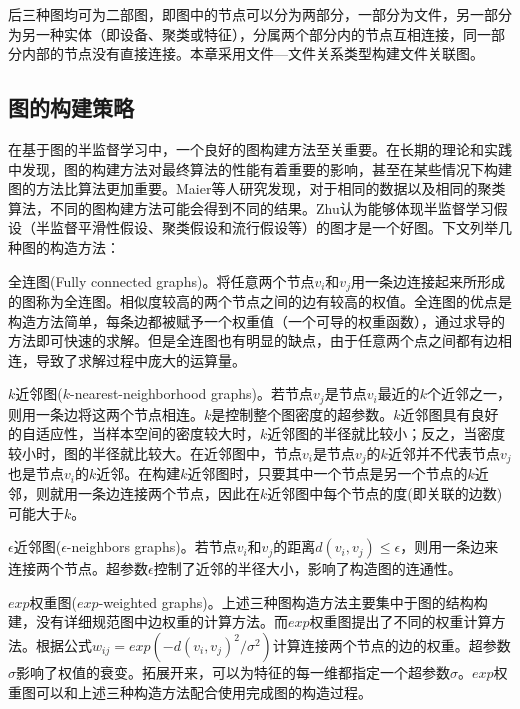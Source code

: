 后三种图均可为二部图，即图中的节点可以分为两部分，一部分为文件，另一部分为另一种实体（即设备、聚类或特征），分属两个部分内的节点互相连接，同一部分内部的节点没有直接连接。本章采用文件—文件关系类型构建文件关联图。
\subsection{图的构建策略}
\label{sec:graphStrategy}
在基于图的半监督学习中，一个良好的图构建方法至关重要。在长期的理论和实践中发现，图的构建方法对最终算法的性能有着重要的影响，甚至在某些情况下构建图的方法比算法更加重要。Maier\cite{maier2008influence}等人研究发现，对于相同的数据以及相同的聚类算法，不同的图构建方法可能会得到不同的结果。Zhu\cite{zhu2005semi}认为能够体现半监督学习假设（半监督平滑性假设、聚类假设和流行假设等）的图才是一个好图。下文列举几种图的构造方法：
\begin{asparaenum}
\item 全连图(Fully connected graphs)。将任意两个节点$v_{i}$和$v_{j}$用一条边连接起来所形成的图称为全连图。相似度较高的两个节点之间的边有较高的权值。全连图的优点是构造方法简单，每条边都被赋予一个权重值（一个可导的权重函数），通过求导的方法即可快速的求解。但是全连图也有明显的缺点，由于任意两个点之间都有边相连，导致了求解过程中庞大的运算量。
\item $k$近邻图($k$-nearest-neighborhood graphs)。若节点$v_{j}$是节点$v_{i}$最近的$k$个近邻之一，则用一条边将这两个节点相连。$k$是控制整个图密度的超参数。$k$近邻图具有良好的自适应性，当样本空间的密度较大时，$k$近邻图的半径就比较小；反之，当密度较小时，图的半径就比较大。在近邻图中，节点$v_{i}$是节点$v_{j}$的$k$近邻并不代表节点$v_{j}$也是节点$v_{i}$的$k$近邻。在构建$k$近邻图时，只要其中一个节点是另一个节点的$k$近邻，则就用一条边连接两个节点，因此在$k$近邻图中每个节点的度(即关联的边数)可能大于$k$。
\item $\epsilon$近邻图($\epsilon$-neighbors graphs)。若节点$v_{i}$和$v_{j}$的距离$d(v_{i},v_{j})\leqslant \epsilon$，则用一条边来连接两个节点。超参数$\epsilon$控制了近邻的半径大小，影响了构造图的连通性。
\item $exp$权重图($exp$-weighted graphs)。上述三种图构造方法主要集中于图的结构构建，没有详细规范图中边权重的计算方法。而$exp$权重图提出了不同的权重计算方法。根据公式$w_{ij}=exp(-d(v_{i},v_{j})^{2}/{\sigma}^{2})$计算连接两个节点的边的权重。超参数$\sigma$影响了权值的衰变。拓展开来，可以为特征的每一维都指定一个超参数$\sigma$。$exp$权重图可以和上述三种构造方法配合使用完成图的构造过程。
\end{asparaenum}

